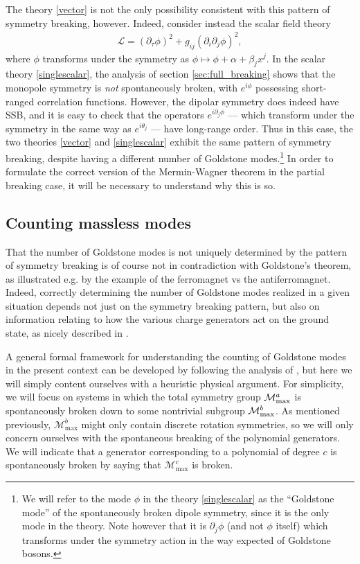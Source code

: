 \documentclass[prb,aps,twocolumn, amsfonts,amsmath,amssymb,nofootinbib,superscriptaddress]{revtex4-2}
\renewcommand{\max}{\text{max}}
\newcommand{\mmax}[1]{\mathcal{M}^{#1}_\max}
\newcommand{\p}{\partial}
\renewcommand{\t}{\theta}
\newcommand{\mcm}{\mathcal{M}}
\begin{document}
The theory \eqref{vector} is not the only possibility consistent with this pattern of symmetry breaking, however. Indeed, consider instead the scalar field theory 
\begin{align}
\label{singlescalar}    \mathcal{L} = (\partial_\tau\phi)^2 + g_{ij} (\partial_i\partial_j\phi)^2, \end{align}
where $\phi$ transforms under the symmetry as $\phi \mapsto \phi + \alpha + \beta_jx^j$. 
 In the scalar theory \eqref{singlescalar}, the analysis of section \ref{sec:full_breaking} shows that the monopole symmetry is {\it not} spontaneously broken, with $e^{i\phi}$ possessing short-ranged correlation functions. However, the dipolar symmetry does indeed have SSB, and it is easy to check that the operators $e^{i\p_j\phi}$ --- which transform under the symmetry in the same way as $e^{i\t_j}$ --- have long-range order. Thus in this case, the two theories \eqref{vector} and \eqref{singlescalar} exhibit the same pattern of symmetry breaking, despite having a different number of Goldstone modes.\footnote{We will refer to the mode $\phi$ in the theory \eqref{singlescalar} as the ``Goldstone mode'' of the spontaneously broken dipole symmetry, since it is the only mode in the theory. Note however that it is $\p_j\phi$ (and not $\phi$ itself) which transforms under the symmetry action in the way expected of Goldstone bosons.} In order to formulate the correct version of the Mermin-Wagner theorem in the partial breaking case, it will be necessary to understand why this is so.  


\subsection{Counting massless modes} \label{sub:subgroup}

That the number of Goldstone modes is not uniquely determined by the pattern of symmetry breaking is of course not in contradiction with Goldstone's theorem, as illustrated e.g. by the example of the ferromagnet vs the antiferromagnet. Indeed, correctly determining the number of Goldstone modes realized in a given situation depends not just on the symmetry breaking pattern, but also on information relating to how the various charge generators act on the ground state, as nicely described in \cite{watanabe2013redundancies}.

A general formal framework for understanding the counting of Goldstone modes in the present context can be developed by following the analysis of \cite{watanabe2013redundancies}, but here we will simply content ourselves with a heuristic physical argument. For simplicity, we will focus on systems in which the total symmetry group $\mcm_{\rm max}^a$ is spontaneously broken down to some nontrivial subgroup $\mcm_{\rm max}^b$. As mentioned previously, $\mmax{b}$ might only contain discrete rotation symmetries, so we will only concern ourselves with the spontaneous breaking of the polynomial generators. We will indicate that a generator corresponding to a polynomial of degree $c$ is spontaneously broken by saying that $\mmax{c}$ is broken.
\end{document}
